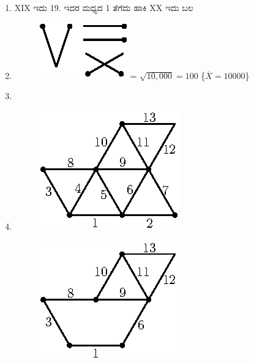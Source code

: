 \begin{enumerate}
\item XIX ಇದು 19. ಇದರ ಮಧ್ಯದ 1 ತೆಗೆದು ಹಾಕಿ XX ಇದು ಬಲ  

\item 
\begin{figure}[H]
\centering
\includegraphics{images/chap3/ans11.eps}
= $\sqrt{10,000} = 100$ \{$\overline{X} = 10000$\}
\end{figure}


\item


\item
\begin{figure}[H]
\centering
\includegraphics{images/chap3/q13.eps}
\end{figure}

\begin{figure}[H]
\centering
\includegraphics{images/chap3/ans13.eps}
\end{figure}


\end{enumerate}
